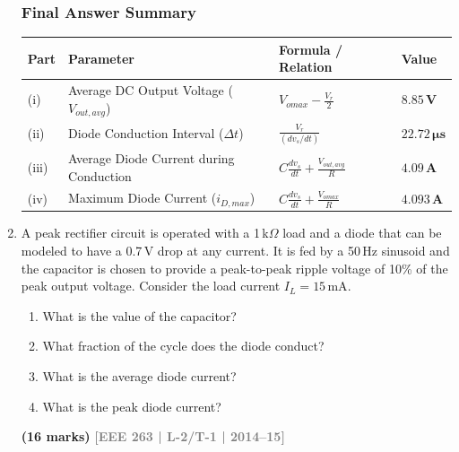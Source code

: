 \documentclass[12pt,a3paper]{article}
\newcommand{\yr}[1]{\hfill\textcolor{gray}{\small\textbf{[#1]}}}
\newcommand{\mk}[1]{\textcolor{orange!70!black}{\small\textbf{(#1 marks)}}}
\begin{document}
\begin{enumerate}
\begin{tcolorbox}[enhanced,breakable,ansbox,colback=cA!4,colframe=cA,boxrule=0.8pt,arc=5pt,title={\textbf{Answer}},fonttitle=\bfseries\color{white},colbacktitle=cA]
\subsubsection*{Final Answer Summary}
\begin{center}
\renewcommand{\arraystretch}{1.5}
\begin{tabular}{@{}lll@{\quad}l@{}}
    \toprule
    \textbf{Part} & \textbf{Parameter} & \textbf{Formula / Relation} & \textbf{Value} \\
    \midrule
    (i) & Average DC Output Voltage ($V_{out,avg}$) & $V_{omax} - \frac{V_r}{2}$ & $\mathbf{8.85\,\text{V}}$ \\
    (ii) & Diode Conduction Interval ($\Delta t$) & $\frac{V_r}{(dv_s/dt)}$ & $\mathbf{22.72\,\mu\text{s}}$ \\
    (iii) & Average Diode Current during Conduction & $C\frac{dv_s}{dt} + \frac{V_{out,avg}}{R}$ & $\mathbf{4.09\,\text{A}}$ \\
    (iv) & Maximum Diode Current ($i_{D,max}$) & $C\frac{dv_s}{dt} + \frac{V_{omax}}{R}$ & $\mathbf{4.093\,\text{A}}$ \\
    \bottomrule
\end{tabular}
\end{center}

\end{tcolorbox}

\item A peak rectifier circuit is operated with a 1\,k$\Omega$ load and a diode that can be modeled to have a 0.7\,V drop at any current. It is fed by a 50\,Hz sinusoid and the capacitor is chosen to provide a peak-to-peak ripple voltage of 10\% of the peak output voltage. Consider the load current $I_L = 15\,\text{mA}$.
\begin{enumerate}
  \item What is the value of the capacitor?
  \item What fraction of the cycle does the diode conduct?
  \item What is the average diode current?
  \item What is the peak diode current?
\end{enumerate}
\mk{16} \yr{EEE 263 | L-2/T-1 | 2014--15}

\begin{tcolorbox}[enhanced,breakable,ansbox,colback=cA!4,colframe=cA,boxrule=0.8pt,arc=5pt,title={\textbf{Answer}},fonttitle=\bfseries\color{white},colbacktitle=cA]


\end{tcolorbox}
\end{enumerate}
\end{document}
